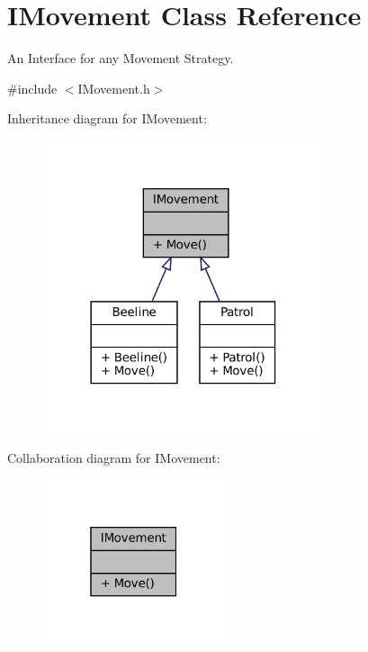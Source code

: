 \hypertarget{classIMovement}{}\section{I\+Movement Class Reference}
\label{classIMovement}


An Interface for any Movement Strategy.  




{\ttfamily \#include $<$I\+Movement.\+h$>$}



Inheritance diagram for I\+Movement\+:\nopagebreak
\begin{figure}[H]
\begin{center}
\leavevmode
\includegraphics[width=234pt]{classIMovement__inherit__graph}
\end{center}
\end{figure}


Collaboration diagram for I\+Movement\+:\nopagebreak
\begin{figure}[H]
\begin{center}
\leavevmode
\includegraphics[width=151pt]{classIMovement__coll__graph}
\end{center}
\end{figure}
